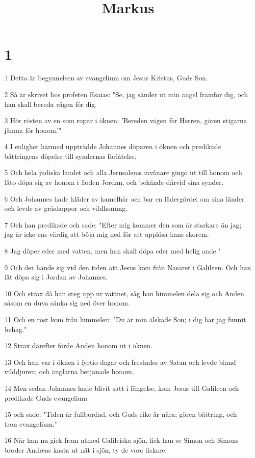 

\title{Markus}


\chapter{1}

\par 1 Detta är begynnelsen av evangelium om Jesus Kristus, Guds Son.
\par 2 Så är skrivet hos profeten Esaias: "Se, jag sänder ut min ängel framför dig, och han skall bereda vägen för dig.
\par 3 Hör rösten av en som ropar i öknen: 'Bereden vägen för Herren, gören stigarna jämna för honom.'"
\par 4 I enlighet härmed uppträdde Johannes döparen i öknen och predikade bättringens döpelse till syndernas förlåtelse.
\par 5 Och hela judiska landet och alla Jerusalems invånare gingo ut till honom och läto döpa sig av honom i floden Jordan, och bekände därvid sina synder.
\par 6 Och Johannes hade kläder av kamelhår och bar en lädergördel om sina länder och levde av gräshoppor och vildhonung.
\par 7 Och han predikade och sade: "Efter mig kommer den som är starkare än jag; jag är icke ens värdig att böja mig ned för att upplösa hans skorem.
\par 8 Jag döper eder med vatten, men han skall döpa eder med helig ande."
\par 9 Och det hände sig vid den tiden att Jesus kom från Nasaret i Galileen. Och han lät döpa sig i Jordan av Johannes.
\par 10 Och strax då han steg upp ur vattnet, såg han himmelen dela sig och Anden såsom en duva sänka sig ned över honom.
\par 11 Och en röst kom från himmelen: "Du är min älskade Son; i dig har jag funnit behag."
\par 12 Strax därefter förde Anden honom ut i öknen.
\par 13 Och han var i öknen i fyrtio dagar och frestades av Satan och levde bland vilddjuren; och änglarna betjänade honom.
\par 14 Men sedan Johannes hade blivit satt i fängelse, kom Jesus till Galileen och predikade Guds evangelium
\par 15 och sade: "Tiden är fullbordad, och Guds rike är nära; gören bättring, och tron evangelium."
\par 16 När han nu gick fram utmed Galileiska sjön, fick han se Simon och Simons broder Andreas kasta ut nät i sjön, ty de voro fiskare.
